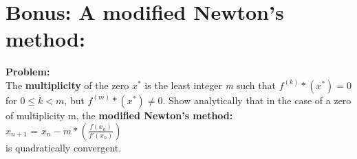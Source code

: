 \section{Bonus: A modified Newton's method:}%
\label{sec:bonus_a_modified_newton_s_method_}

\textbf{Problem:}\\
The \textbf{multiplicity} of the zero $x^*$ is the least integer \textit{m} such that  $f^(k)*(x^*) = 0$ for  $0 \le k < m$, but $f^(m)*(x^*) \neq 0.$
Show analytically that in the case of a zero of multiplicity m, the \textbf{modified Newton's method:}
\\
$x_{n+1}$ = $x_{n} - m* (\frac{f(x_{n})}{f'(x_{n})})$\\
 is quadratically convergent.

